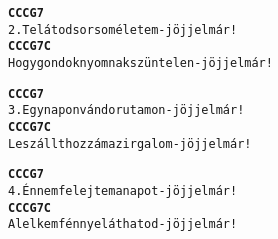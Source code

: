 \newpage
{}
\kottastart
{}
\kottaend
\begin{minipage}{\textwidth}
\begin{alltt}
\textbf{       C           C         C       G7}
2. Te látod sorsom életem - jöjj el már!
\textbf{         C               C          C   G7  C}
   Hogy gondok nyomnak szüntelen - jöjj el már!
\end{alltt}
\vspace{0.0cm}
\versszakspacing
\end{minipage}
\begin{minipage}{\textwidth}
\begin{alltt}
\textbf{        C          C         C       G7}
3. Egy napon vándorutamon - jöjj el már!
\textbf{       C              C          C   G7  C}
   Leszállt hozzám az irgalom - jöjj el már!
\end{alltt}
\vspace{0.0cm}
\versszakspacing
\end{minipage}
\begin{minipage}{\textwidth}
\begin{alltt}
\textbf{       C              C       C       G7}
4. Én nem felejtem a napot - jöjj el már!
\textbf{      C             C          C   G7  C}
   A lelkem fénnyel áthatod - jöjj el már!
\end{alltt}
\vspace{0.0cm}
\versszakspacing
\end{minipage}
